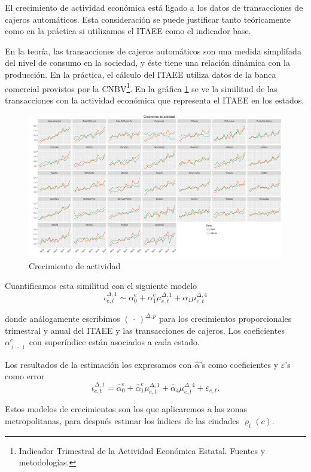 \documentclass[]{article}
\let\rmarkdownfootnote\footnote%
\def\footnote{\protect\rmarkdownfootnote}
\begin{document}
El crecimiento de actividad económica está ligado a los datos de
transacciones de cajeros automáticos. Esta consideración se puede
justificar tanto teóricamente como en la práctica si utilizamos el ITAEE
como el indicador base.

En la teoría, las transacciones de cajeros automáticos son una medida
simplifada del nivel de consumo en la sociedad, y éste tiene una
relación dinámica con la producción. En la práctica, el cálculo del
ITAEE utiliza datos de la banca comercial provistos por la
CNBV\footnote{Indicador Trimestral de la Actividad Económica Estatal.
  Fuentes y metodologías.}. En la gráfica \ref{crecimiento} se ve la
similitud de las transacciones con la actividad económica que representa
el ITAEE en los estados.

\begin{figure}[htbp]
\centering
\includegraphics{ficha_figs/crecimiento_actividad.png}
\caption{Crecimiento de actividad\label{crecimiento}}
\end{figure}

Cuantificamos esta similitud con el siguiente modelo
\[ \iota_{e,t}^{\Delta,1} \sim \alpha_0^e + 
\alpha_1^e\mu_{e,t}^{\Delta,1} + \alpha_4\mu_{e,t}^{\Delta,4}\]

donde análogamente escribimos \((\,\cdot\,)^{\Delta,p}\) para los
crecimientos proporcionales trimestral y anual del ITAEE y las
transacciones de cajeros. Los coeficientes \(\alpha_{(\,\cdot\,)}^e\)
con superíndice están asociados a cada estado.

Los resultados de la estimación los expresamos con \(\hat \alpha\)'s
como coeficientes y \(\varepsilon\)'s como error
\[ \iota_{e,t}^{\Delta,1} = \hat\alpha_0^e + 
\hat\alpha_1^e\mu_{e,t}^{\Delta,1} + \hat\alpha_4\mu_{e,t}^{\Delta,4} + \varepsilon_{e,t}. \]

Estos modelos de crecimientos son los que aplicaremos a las zonas
metropolitanas, para después estimar los índices de las ciudades
\(\varrho_t(c)\).
\end{document}

